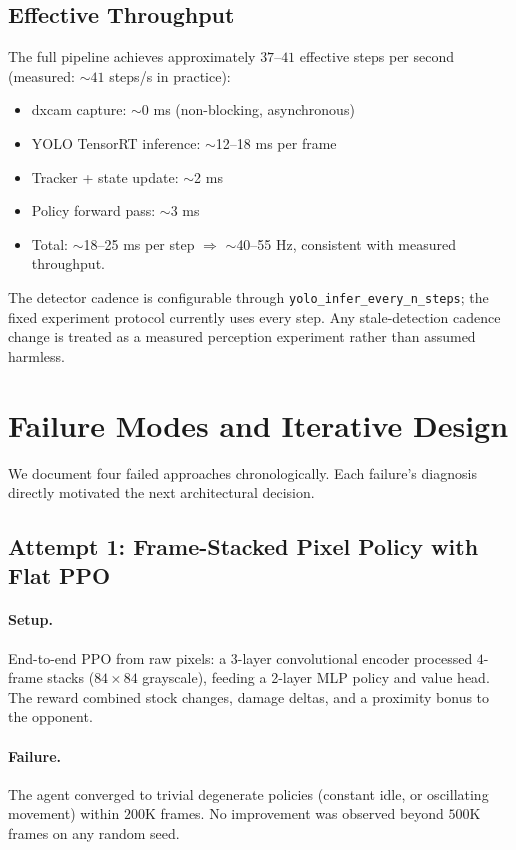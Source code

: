 \documentclass[11pt,a4paper]{article}
\begin{document}
\subsection{Effective Throughput}

The full pipeline achieves approximately $37$--$41$ effective steps per second (measured: ${\sim}41$ steps/s in practice):
\begin{itemize}[leftmargin=1.5em]
    \item dxcam capture: $\sim$0 ms (non-blocking, asynchronous)
    \item YOLO TensorRT inference: $\sim$12--18 ms per frame
    \item Tracker + state update: $\sim$2 ms
    \item Policy forward pass: $\sim$3 ms
    \item Total: $\sim$18--25 ms per step $\Rightarrow$ $\sim$40--55 Hz, consistent with measured throughput.
\end{itemize}
The detector cadence is configurable through \texttt{yolo\_infer\_every\_n\_steps}; the fixed experiment protocol currently uses every step. Any stale-detection cadence change is treated as a measured perception experiment rather than assumed harmless.

\section{Failure Modes and Iterative Design}
\label{sec:failures}

We document four failed approaches chronologically.
Each failure's diagnosis directly motivated the next architectural decision.

\subsection{Attempt 1: Frame-Stacked Pixel Policy with Flat PPO}
\label{sec:pixel-failures}

\paragraph{Setup.}
End-to-end PPO from raw pixels: a 3-layer convolutional encoder processed $4$-frame stacks ($84 \times 84$ grayscale), feeding a 2-layer MLP policy and value head.
The reward combined stock changes, damage deltas, and a proximity bonus to the opponent.

\paragraph{Failure.}
The agent converged to trivial degenerate policies (constant idle, or oscillating movement) within $200$K frames.
No improvement was observed beyond $500$K frames on any random seed.
\end{document}
